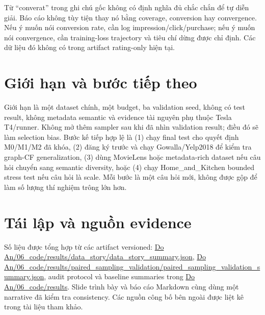 \documentclass[12pt,a4paper]{article}
\newcommand{\sourcepath}[1]{{\footnotesize\url{#1}}}
\begin{document}
Từ ``converat'' trong ghi chú gốc không có định nghĩa đủ chắc chắn để tự diễn giải. Báo cáo không tùy tiện thay nó bằng coverage, conversion hay convergence. Nếu ý muốn nói conversion rate, cần log impression/click/purchase; nếu ý muốn nói convergence, cần training-loss trajectory và tiêu chí dừng được chỉ định. Các dữ liệu đó không có trong artifact rating-only hiện tại.

\section{Giới hạn và bước tiếp theo}
Giới hạn là một dataset chính, một budget, ba validation seed, không có test result, không metadata semantic và evidence tài nguyên phụ thuộc Tesla T4/runner. Không mở thêm sampler sau khi đã nhìn validation result; điều đó sẽ làm selection bias. Bước kế tiếp hợp lệ là (1) chạy final test cho quyết định M0/M1/M2 đã khóa, (2) đăng ký trước và chạy Gowalla/Yelp2018 để kiểm tra graph-CF generalization, (3) dùng MovieLens hoặc metadata-rich dataset nếu câu hỏi chuyển sang semantic diversity, hoặc (4) chạy Home\_and\_Kitchen bounded stress test nếu câu hỏi là scale. Mỗi bước là một câu hỏi mới, không được gộp để làm số lượng thí nghiệm trông lớn hơn.

\section*{Tái lập và nguồn evidence}
Số liệu được tổng hợp từ các artifact versioned: \sourcepath{Do An/06_code/results/data_story/data_story_summary.json}, \sourcepath{Do An/06_code/results/paired_sampling_validation/paired_sampling_validation_summary.json}, audit protocol và baseline summaries trong \sourcepath{Do An/06_code/results}. Slide trình bày và báo cáo Markdown cùng dùng một narrative đã kiểm tra consistency. Các nguồn công bố bên ngoài được liệt kê trong tài liệu tham khảo.

\begingroup\small


\endgroup
\end{document}
